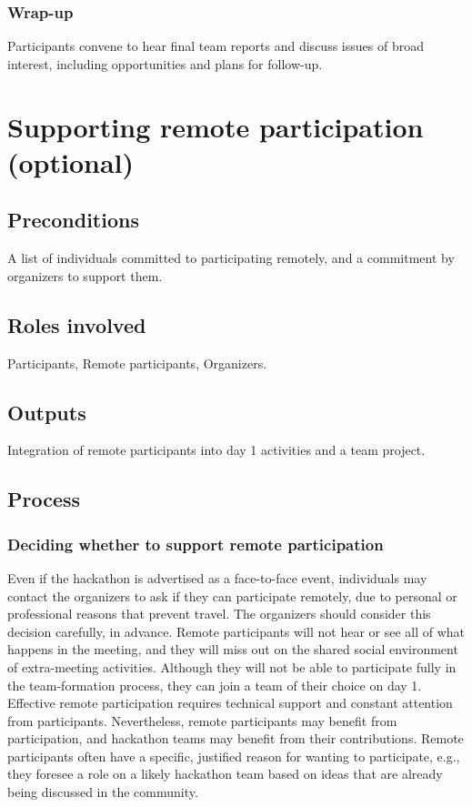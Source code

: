 \documentclass[11pt]{article}
\begin{document}
\subsubsection*{Wrap-up} Participants convene to hear final team reports and discuss issues of broad interest, including opportunities and plans for follow-up.  

\newpage
\section{Supporting remote participation (optional)}
\subsection{Preconditions}
A list of individuals committed to participating remotely, and a commitment by organizers to support them. 
\subsection{Roles involved}
Participants, Remote participants, Organizers. 
\subsection{Outputs}
Integration of remote participants into day 1 activities and a team project.  
\subsection{Process}
\subsubsection*{Deciding whether to support remote participation} Even if the hackathon is advertised as a face-to-face event, individuals may contact the organizers to ask if they can participate remotely, due to personal or professional reasons that prevent travel.  The organizers should consider this decision carefully, in advance. Remote participants will not hear or see all of what happens in the meeting, and they will miss out on the shared social environment of extra-meeting activities. Although they will not be able to participate fully in the team-formation process, they can join a team of their choice on day 1. Effective remote participation requires technical support and constant attention from participants. Nevertheless, remote participants may benefit from participation, and hackathon teams may benefit from their contributions. Remote participants often have a specific, justified reason for wanting to participate, e.g., they foresee a role on a likely hackathon team based on ideas that are already being discussed in the community.  
\end{document}

